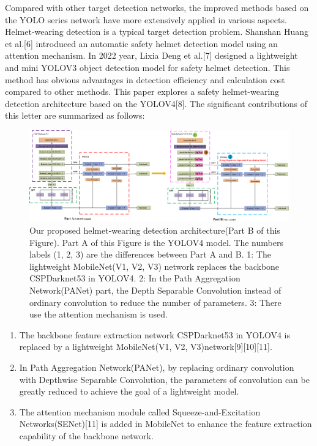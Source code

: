 \documentclass[journal]{IEEEtran}
\begin{document}
 Compared with other target detection networks, the improved methods based on the YOLO series network have  more extensively applied in various aspects. Helmet-wearing detection is a typical target detection problem. Shanshan Huang et al.[6] introduced an automatic safety helmet detection model using an attention mechanism. In 2022 year, Lixia Deng et al.[7] designed a lightweight and mini YOLOV3 object detection model for safety helmet detection. This method has obvious advantages in detection efficiency and calculation cost compared to other methods. This paper explores a safety helmet-wearing detection architecture based on the YOLOV4[8]. The significant contributions of this letter are summarized
as follows:
\begin{figure}
\centerline{\includegraphics[width=2\columnwidth]{QiHe1.png}}
\caption{Our proposed helmet-wearing
detection architecture(Part B of this Figure). Part A of this Figure is the YOLOV4 model. The numbers labels (1, 2, 3) are the differences between Part A and B. 1: The lightweight MobileNet(V1, V2, V3) network replaces the backbone CSPDarknet53 in YOLOV4. 2: In the Path Aggregation Network(PANet) part, the Depth Separable Convolution instead of ordinary convolution to reduce the number of parameters. 3: There use the attention mechanism is used.}
\end{figure}
\begin{enumerate}[]
\item The backbone feature extraction network CSPDarknet53 in YOLOV4 is replaced by a lightweight MobileNet(V1, V2, V3)network[9][10][11].

\item In Path Aggregation Network(PANet), by replacing ordinary convolution with Depthwise Separable Convolution, the parameters of convolution can be greatly reduced to achieve the goal of a lightweight model.
\item The attention mechanism module called Squeeze-and-Excitation Networks(SENet)[11] is added in MobileNet to enhance the feature extraction capability of the backbone network.
\end{enumerate}
\end{document}

